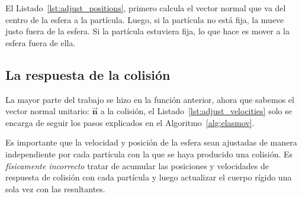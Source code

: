 El Listado~\ref{lst:adjust_positions}, primero calcula el vector normal que va del centro de la esfera a la partícula.
Luego, si la partícula no está fija, la mueve justo fuera de la esfera.
Si la partícula estuviera fija, lo que hace es mover a la esfera fuera de ella.

\subsection{La respuesta de la colisión}
La mayor parte del trabajo se hizo en la función anterior, ahora que sabemos el vector normal unitario: $\vec{\textbf{n}}$ a la colisión, el Listado~\ref{lst:adjust_velocities} solo se encarga de seguir los pasos explicados en el Algoritmo~\ref{alg:elasmov}.


Es importante que la velocidad y posición de la esfera sean ajustadas de manera independiente por cada partícula con la que se haya producido una colisión.
Es \emph{físicamente incorrecto} tratar de acumular las posiciones y velocidades de respuesta de colisión con cada partícula y luego actualizar el cuerpo rígido una sola vez con las resultantes.
